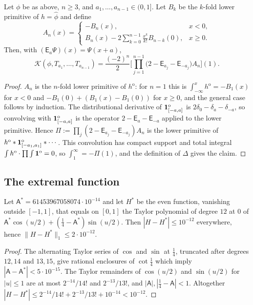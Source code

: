 \documentclass[11pt,colorlinks]{charlie}
\newcommand{\Ka}{\mathcal{K}}
\newcommand{\ho}[1]{#1^{\mathrm{o}}}
\begin{document}
\begin{lemma}\label{lem:shift}
Let $\phi$ be as above, $n\ge3$, and $a_1,\dots,a_{n-1}\in(0,1]$. Let $B_k$ be the $k$-fold lower primitive of $h=\widehat\phi$ and define
\[
 A_n(x)=\begin{cases}-B_n(x),&x<0,\\ B_n(x)-2\sum_{k=0}^{n-1}\frac{x^k}{k!}B_{n-k}(0),&x\ge0.\end{cases}
\]
Then, with $(\mathsf E_a\Psi)(x)=\Psi(x+a)$,
\[
 \Ka(\phi,T_{a_1},\dots,T_{a_{n-1}})=\frac{(-2)^n}2\Big[\prod_{j=1}^{n-1}\big(2-\mathsf E_{a_j}-\mathsf E_{-a_j}\big)A_n\Big](1).
\]
\end{lemma}
\begin{proof}
$A_n$ is the $n$-fold lower primitive of $\ho h$: for $n=1$ this is $\int_{-\infty}^x\ho h=-B_1(x)$ for $x<0$ and $-B_1(0)+(B_1(x)-B_1(0))$ for $x\ge0$, and the general case follows by induction. The distributional derivative of $\ho{\one_{[-a,a]}}$ is $2\delta_0-\delta_a-\delta_{-a}$, so convolving with $\ho{\one_{[-a,a]}}$ is the operator $2-\mathsf E_a-\mathsf E_{-a}$ applied to the lower primitive. Hence $\Pi:=\prod_j(2-\mathsf E_{a_j}-\mathsf E_{-a_j})A_n$ is the lower primitive of $\ho h*\ho{\one_{[-a_1,a_1]}}*\cdots$. This convolution has compact support and total integral $\int\ho h\cdot\prod\int\ho{\one}=0$, so $\int_1^\infty=-\Pi(1)$, and the definition of $\Delta$ gives the claim.
\end{proof}

\subsection{The extremal function}
\begin{lemma}\label{lem:Hstar}
Let $\mathsf A^*=61453967058074\cdot10^{-14}$ and let $H^*$ be the even function, vanishing outside $[-1,1]$, that equals on $[0,1]$ the Taylor polynomial of degree $12$ at $0$ of $\mathsf A^*\cos(u/2)+(\frac14-\mathsf A^*)\sin(u/2)$. Then $|H-H^*|\le10^{-12}$ everywhere, hence $\|H-H^*\|_1\le2\cdot10^{-12}$.
\end{lemma}
\begin{proof}
The alternating Taylor series of $\cos$ and $\sin$ at $\frac14$, truncated after degrees $12,14$ and $13,15$, give rational enclosures of $\cot\frac14$ which imply $|\mathsf A-\mathsf A^*|<5\cdot10^{-15}$. The Taylor remainders of $\cos(u/2)$ and $\sin(u/2)$ for $|u|\le1$ are at most $2^{-14}/14!$ and $2^{-13}/13!$, and $|\mathsf A|,|\frac14-\mathsf A|<1$. Altogether $|H-H^*|\le2^{-14}/14!+2^{-13}/13!+10^{-14}<10^{-12}$.
\end{proof}
\end{document}
